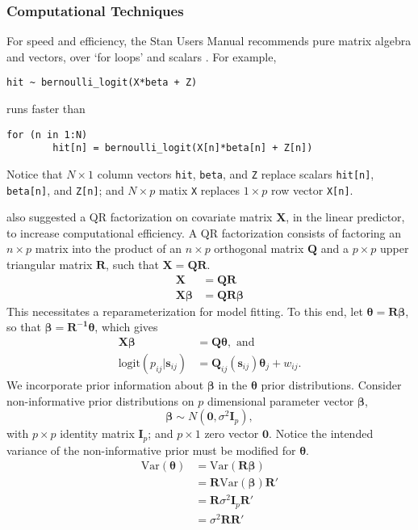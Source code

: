 \subsubsection{Computational Techniques} %
For speed and efficiency, the Stan Users Manual recommends pure matrix algebra and vectors, over `for loops' and scalars \cite{STANtheMan}. For example, 
\begin{verbatim}
hit ~ bernoulli_logit(X*beta + Z)
\end{verbatim}
runs faster than
\begin{verbatim}
for (n in 1:N)
        hit[n] = bernoulli_logit(X[n]*beta[n] + Z[n])
\end{verbatim}
Notice that $N \times 1$ column vectors \verb|hit|, \verb|beta|, and \verb|Z| replace scalars \verb|hit[n]|, \verb|beta[n]|, and \verb|Z[n]|; and $N \times p$ matix \verb|X| replaces $1 \times p$ row vector \verb|X[n]|.

\cite{Trangucci} also suggested a QR factorization on covariate matrix $\pmb{X}$, in the linear predictor, to increase computational efficiency. A QR factorization consists of factoring an $n \times p$ matrix into the product of an $n \times p$ orthogonal matrix $\pmb{Q}$ and a $p \times p$ upper triangular matrix $\pmb{R}$, such that $\pmb{X} = \pmb{QR}$. 
\begin{align}
\pmb{X} &= \pmb{QR} \\
\pmb{X \beta} &= \pmb{QR \beta}
\end{align}
This necessitates a reparameterization for model fitting. To this end, let $\pmb{\theta} = \pmb{R \beta}$, so that $\pmb{\beta} = \pmb{R^{-1}\theta}$, which gives
\begin{align}
\pmb{X \beta} &= \pmb{Q \theta}, \text{ and } \\
\text{logit}(p_{ij}|\pmb{s}_{ij}) &= \pmb{Q}_{ij}(\pmb{s}_{ij}) \pmb{\theta}_{j} + w_{ij}.
\end{align}
We incorporate prior information about $\pmb{\beta}$ in the $\pmb{\theta}$ prior distributions. Consider non-informative prior distributions on $p$ dimensional parameter vector $\pmb{\beta}$,
$$ \pmb{\beta} \sim N(\pmb{0}, \sigma^{2}\pmb{I}_{p}), $$
with $p \times p$ identity matrix $\pmb{I}_{p}$; and $p \times 1$ zero vector $\pmb{0}$. Notice the intended variance of the non-informative prior must be modified for $\pmb{\theta}$.
\begin{align}
\text{Var}(\pmb{\theta}) &= \text{Var}(\pmb{R \beta}) \\
&= \pmb{R}\text{Var}(\pmb{\beta})\pmb{R}' \\
&= \pmb{R}\sigma^{2}\pmb{I}_{p}\pmb{R}' \\
&= \sigma^{2} \pmb{R}\pmb{R}'
\end{align}

